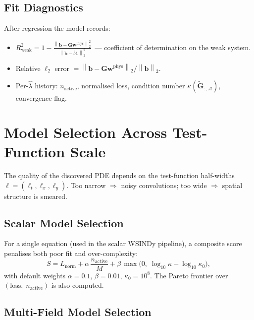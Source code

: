 \documentclass[11pt, letterpaper]{article}
\theoremstyle{definition}
\newcommand{\vw}{\mathbf{w}}
\newcommand{\vb}{\mathbf{b}}
\newcommand{\vG}{\mathbf{G}}
\newcommand{\norm}[1]{\left\lVert #1 \right\rVert}
\begin{document}
\subsection{Fit Diagnostics}
\label{sec:diagnostics}

After regression the model records:
\begin{itemize}[nosep]
  \item $R^{2}_{\mathrm{weak}}
    = 1 - \frac{\norm{\vb - \vG\vw^{\mathrm{phys}}}_2^{2}}
               {\norm{\vb - \bar{b}\mathbf{1}}_2^{2}}$
    \,--- coefficient of determination on the weak system.
  \item Relative $\ell_2$ error
    $= \norm{\vb - \vG\vw^{\mathrm{phys}}}_2 / \norm{\vb}_2$.
  \item Per-$\hat\lambda$ history: $n_{\mathrm{active}}$, normalised
    loss, condition number $\kappa(\tilde{\vG}_{:,\mathcal{A}})$,
    convergence flag.
\end{itemize}

\section{Model Selection Across Test-Function Scale}
\label{sec:model-selection}

The quality of the discovered PDE depends on the test-function
half-widths $\bm\ell = (\ell_t, \ell_x, \ell_y)$.  Too narrow
$\Rightarrow$ noisy convolutions; too wide $\Rightarrow$ spatial
structure is smeared.

\subsection{Scalar Model Selection}
\label{sec:scalar-select}

For a single equation (used in the scalar WSINDy pipeline), a
composite score penalises both poor fit and over-complexity:
\begin{equation}
\label{eq:composite-score}
  S
  = L_{\mathrm{norm}}
  + \alpha \,\frac{n_{\mathrm{active}}}{M}
  + \beta \,\max\!\bigl(0,\;\log_{10}\kappa - \log_{10}\kappa_0\bigr),
\end{equation}
with default weights $\alpha = 0.1$, $\beta = 0.01$,
$\kappa_0 = 10^{8}$.  The Pareto frontier over
$(\text{loss},\; n_{\mathrm{active}})$ is also computed.

\subsection{Multi-Field Model Selection}
\label{sec:multifield-select}
\end{document}
